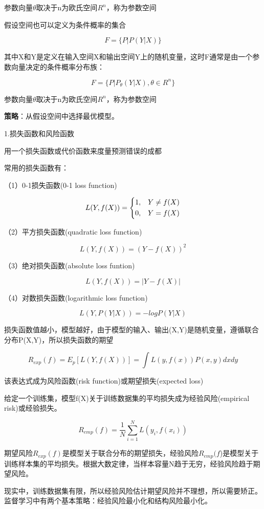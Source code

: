 \documentclass{ctexart}
\begin{document}
	参数向量\(\theta\)取决于n为欧氏空间\(R^n\)，称为参数空间
	
	假设空间也可以定义为条件概率的集合
	
	\[F=\{P|P(Y|X)\}\]
	
	其中X和Y是定义在输入空间X和输出空间Y上的随机变量，这时F通常是由一个参数向量决定的条件概率分布族：
	
	\[F=\{P|P_\theta(Y|X), \theta \in R^n\}\]
	
	参数向量\(\theta\)取决于n为欧氏空间\(R^n\)，称为参数空间
	
	\mbox{}
	
	\textbf{策略}：从假设空间中选择最优模型。
	
	1.损失函数和风险函数
	
	用一个损失函数或代价函数来度量预测错误的成都
	
	常用的损失函数有：
	
	（1）0-1损失函数(0-1 loss function)
	
	\[L(Y, f(X)) = 
	\begin{dcases}
	1,  & Y \neq f(X) \\
	0, & Y = f(X)
	\end{dcases}\]
	
	（2）平方损失函数(quadratic loss function)
	
	\[L(Y, f(X)) = (Y-f(X))^2\]
	
	（3）绝对损失函数(absolute loss funtion)
	
	\[L(Y, f(X)) = |Y - f(X)|\]
	
	
	（4）对数损失函数(logarithmic loss function)
	
	\[L(Y, P(Y|X)) = -logP(Y|X)\]
	
	损失函数值越小，模型越好，由于模型的输入、输出(X,Y)是随机变量，遵循联合分布P(X,Y)，所以损失函数的期望
	
	\[R_{exp}(f) = E_p[L(Y, f(X))] = \int L(y, f(x))P(x, y)dxdy\]
	
	该表达式成为风险函数(risk function)或期望损失(expected loss)
	
	给定一个训练集，模型f(X)关于训练数据集的平均损失成为经验风险(empirical risk)或经验损失。
	
	\[R_{emp}(f) = \frac{1}{N}\sum_{i=1}^{N}L(y_i, f(x_i))\]
	
	期望风险\(R_{exp}(f)\)是模型关于联合分布的期望损失，经验风险\(R_{emp}(f\))是模型关于训练样本集的平均损失。根据大数定律，当样本容量N趋于无穷，经验风险趋于期望风险。
	
	现实中，训练数据集有限，所以经验风险估计期望风险并不理想，所以需要矫正。监督学习中有两个基本策略：经验风险最小化和结构风险最小化。
	
\end{document}
